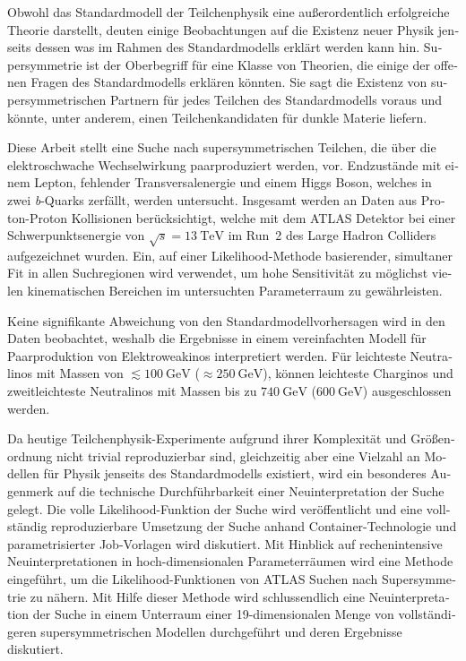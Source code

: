 
\begin{otherlanguage}{ngerman} 
\begin{zusammenfassung}

Obwohl das Standardmodell der Teilchenphysik eine außerordentlich erfolgreiche Theorie darstellt, deuten einige Beobachtungen auf die Existenz neuer Physik jenseits dessen was im Rahmen des Standardmodells erklärt werden kann hin.
Supersymmetrie ist der Oberbegriff für eine Klasse von Theorien, die einige der offenen Fragen des Standardmodells erklären könnten.
Sie sagt die Existenz von supersymmetrischen Partnern für jedes Teilchen des Standardmodells voraus und könnte, unter anderem, einen Teilchenkandidaten für dunkle Materie liefern. 

Diese Arbeit stellt eine Suche nach supersymmetrischen Teilchen, die über die elektroschwache Wechselwirkung paarproduziert werden, vor.
Endzustände mit einem Lepton, fehlender Transversalenergie und einem Higgs Boson, welches in zwei \textit{b}-Quarks zerfällt, werden untersucht.
Insgesamt werden \onethirtynineifb an Daten aus Proton-Proton Kollisionen berücksichtigt, welche mit dem ATLAS Detektor bei einer Schwerpunktsenergie von $\sqrt{s}=\SI{13}{\TeV}$ im Run~2 des Large Hadron Colliders aufgezeichnet wurden.
Ein, auf einer Likelihood-Methode basierender, simultaner Fit in allen Suchregionen wird verwendet, um hohe Sensitivität zu möglichst vielen kinematischen Bereichen im untersuchten Parameterraum zu gewährleisten.

Keine signifikante Abweichung von den Standardmodellvorhersagen wird in den Daten beobachtet, weshalb die Ergebnisse in einem vereinfachten Modell für Paarproduktion von Elektro\-weakinos interpretiert werden.
Für leichteste Neutralinos mit Massen von $\lesssim \SI{100}{\GeV}$ ($\approx\SI{250}{\GeV}$), können leichteste Charginos und zweitleichteste Neutralinos mit Massen bis zu $\SI{740}{\GeV}$ ($\SI{600}{\GeV}$) ausgeschlossen werden.

Da heutige Teilchenphysik-Experimente aufgrund ihrer Komplexität und Größenordnung nicht trivial reproduzierbar sind, gleichzeitig aber eine Vielzahl an Modellen für Physik jenseits des Standardmodells existiert, wird ein besonderes Augenmerk auf die technische Durchführbarkeit einer Neuinterpretation der Suche gelegt.
Die volle Likelihood-Funktion der Suche wird veröffentlicht und eine vollständig reproduzierbare Umsetzung der Suche anhand Container-Technologie und parametrisierter Job-Vorlagen wird diskutiert.
Mit Hinblick auf rechenintensive Neuinterpretationen in hoch-dimensionalen Parameterräumen wird eine Methode eingeführt, um die Likelihood-Funktionen von ATLAS Suchen nach Supersymmetrie zu nähern.
Mit Hilfe dieser Methode wird schlussendlich eine Neuinterpretation der Suche in einem Unterraum einer 19-dimensionalen Menge von vollständigeren supersymmetrischen Modellen durchgeführt und deren Ergebnisse diskutiert. 


\end{zusammenfassung}
\end{otherlanguage}
